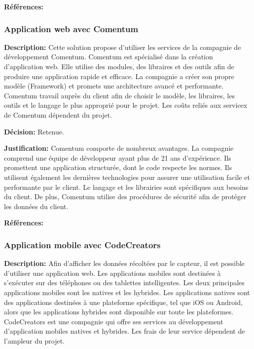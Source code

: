 \textbf{Références:} \cite{PF} \cite{PF_Roma} \cite{PF_exemple} \cite{Dev_salary}

\subsubsection{Application web avec Comentum}

\textbf{Description:} Cette solution propose d'utiliser les services de la compagnie de développement Comentum. Comentum est spécialisé dans la création d'application web. Elle utilise des modules, des libraires et des outils afin de produire une application rapide et efficace. La compagnie a créer son propre modèle (Framework) et promets une architecture avancé et performante. Comentum travail auprès du client afin de choisir le modèle, les libraires, les outils et le langage le plus approprié pour le projet. Les coûts reliés aux servicex de Comentum dépendent du projet.

\textbf{Décision:} Retenue.

\textbf{Justification:} Comentum comporte de nombreux avantages. La compagnie comprend une équipe de développeur ayant plus de 21 ans d'expérience. Ils promettent une application structurée, dont le code respecte les normes. Ils utilisent également les dernières technologies pour assurer une utilisation facile et performante par le client. Le langage et les librairies sont spécifiques aux besoins du client. De plus, Comentum utilise des procédures de sécurité afin de protéger les données du client.

\textbf{Références:} \cite{Comentum}

\subsubsection{Application mobile avec CodeCreators}

\textbf{Description:} Afin d'afficher les données récoltées par le capteur, il est possible d'utiliser une application web. Les applications mobiles sont destinées à s'exécuter sur des téléphones ou des tablettes intelligentes. Les deux principales applications mobiles sont les natives et les hybrides. Les applications natives sont des applications destinées à une plateforme spécifique, tel que iOS ou Android, alors que les applications hybrides sont disponible sur toute les plateformes. CodeCreators est une compagnie qui offre ses services au développement d'application mobiles natives et hybrides. Les frais de leur service dépendent de l'ampleur du projet.

